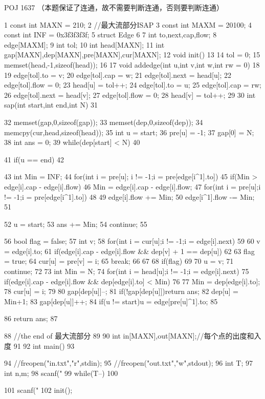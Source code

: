 \documentclass[11pt]{article}
\begin{document}
\begin{Code}
     POJ 1637 （本题保证了连通，故不需要判断连通，否则要判断连通）


 1   const int MAXN = 210;
 2   //最大流部分ISAP
 3   const int MAXM = 20100;
 4   const int INF = 0x3f3f3f3f;
 5   struct Edge
 6   {
 7       int to,next,cap,flow;
 8   }edge[MAXM];
 9   int tol;
10   int head[MAXN];
11   int gap[MAXN],dep[MAXN],pre[MAXN],cur[MAXN];
12   void init()
13   {
14       tol = 0;
15       memset(head,-1,sizeof(head));
16   }
17   void addedge(int u,int v,int w,int rw = 0)
18   {
19       edge[tol].to = v;
20       edge[tol].cap = w;
21       edge[tol].next = head[u];
22       edge[tol].flow = 0;
23       head[u] = tol++;
24       edge[tol].to = u;
25       edge[tol].cap = rw;
26       edge[tol].next = head[v];
27       edge[tol].flow = 0;
28       head[v] = tol++;
29   }
30   int sap(int start,int end,int N)
31   {
32       memset(gap,0,sizeof(gap));
33       memset(dep,0,sizeof(dep));
34       memcpy(cur,head,sizeof(head));
35       int u = start;
36       pre[u] = -1;
37       gap[0] = N;
38       int ans = 0;
39       while(dep[start] < N)
40       {
41           if(u == end)
42           {
43                int Min = INF;
44                for(int i = pre[u]; i != -1;i = pre[edge[i^1].to])
45                    if(Min > edge[i].cap - edge[i].flow)
46                        Min = edge[i].cap - edge[i].flow;
47                for(int i = pre[u];i != -1;i = pre[edge[i^1].to])
48                {
49                    edge[i].flow += Min;
50                    edge[i^1].flow -= Min;
51                }


 52                  u = start;
 53                  ans += Min;
 54                  continue;
 55              }
 56              bool flag = false;
 57              int v;
 58              for(int i = cur[u];i != -1;i = edge[i].next)
 59              {
 60                  v = edge[i].to;
 61                  if(edge[i].cap - edge[i].flow && dep[v] + 1 == dep[u])
 62                  {
 63                       flag = true;
 64                       cur[u] = pre[v] = i;
 65                       break;
 66                  }
 67              }
 68              if(flag)
 69              {
 70                  u = v;
 71                  continue;
 72              }
 73              int Min = N;
 74              for(int i = head[u];i != -1;i = edge[i].next)
 75                  if(edge[i].cap - edge[i].flow && dep[edge[i].to] < Min)
 76                  {
 77                       Min = dep[edge[i].to];
 78                       cur[u] = i;
 79                  }
 80              gap[dep[u]]--;
 81              if(!gap[dep[u]])return ans;
 82              dep[u] = Min+1;
 83              gap[dep[u]]++;
 84              if(u != start)u = edge[pre[u]^1].to;
 85       }
 86       return ans;
 87   }
 88   //the end of 最大流部分
 89
 90   int in[MAXN],out[MAXN];//每个点的出度和入度
 91
 92   int main()
 93   {
 94       //freopen("in.txt","r",stdin);
 95       //freopen("out.txt","w",stdout);
 96       int T;
 97       int n,m;
 98       scanf("%
 99       while(T--)
100       {
101           scanf("%
102           init();


}}
\end{Code}
\end{document}
